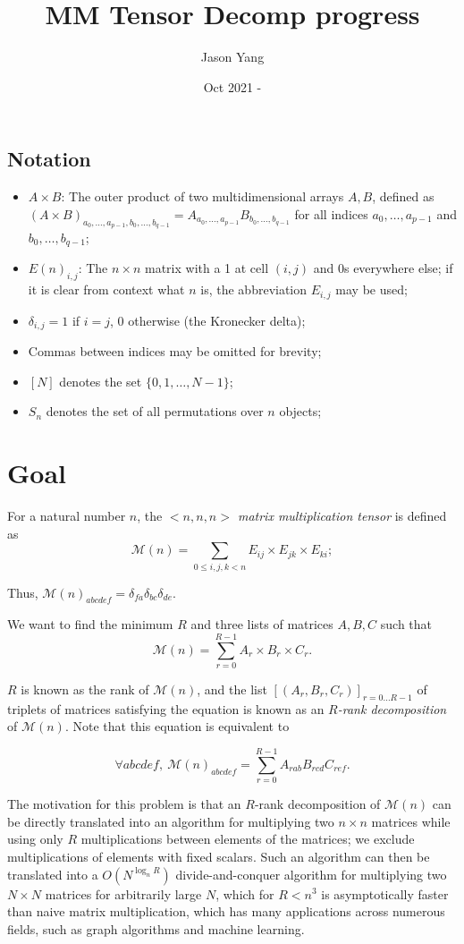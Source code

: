 \documentclass{article}
\title{MM Tensor Decomp progress}
\author{Jason Yang}
\date{Oct 2021 -}
\begin{document}
\maketitle

\subsection*{Notation}
\begin{itemize}
    \item $A\times B$: The outer product of two multidimensional arrays $A,B$, defined as $(A\times B)_{a_0,\dots,a_{p-1},b_0,\dots,b_{q-1}}=A_{a_0,\dots,a_{p-1}}B_{b_0,\dots,b_{q-1}}$ for all indices $a_0,\dots,a_{p-1}$ and $b_0,\dots,b_{q-1}$;
    \item $E(n)_{i,j}$: The $n\times n$ matrix with a 1 at cell $(i,j)$ and 0s everywhere else; if it is clear from context what $n$ is, the abbreviation $E_{i,j}$ may be used;
    \item $\delta_{i,j}=1$ if $i=j$, 0 otherwise (the Kronecker delta);
    \item Commas between indices may be omitted for brevity;
    \item $[N]$ denotes the set $\{0,1,\dots,N-1\}$;
    \item $S_n$ denotes the set of all permutations over $n$ objects;
\end{itemize}

\section{Goal}

For a natural number $n$, the \textit{$<n,n,n>$ matrix multiplication tensor} is defined as
\[\mathcal{M}(n)=\sum_{0\le i,j,k<n} E_{ij}\times E_{jk}\times E_{ki};\]

Thus, $\mathcal{M}(n)_{abcdef}=\delta_{fa}\delta_{bc}\delta_{de}$.

We want to find the minimum $R$ and three lists of matrices $A,B,C$ such that
\[\mathcal{M}(n)=\sum_{r=0}^{R-1}A_r\times B_r\times C_r.\]

$R$ is known as the rank of $\mathcal{M}(n)$, and the list $[(A_r,B_r,C_r)]_{r=0\dots R-1}$ of triplets of matrices satisfying the equation is known as an \textit{$R$-rank decomposition} of $\mathcal{M}(n)$. Note that this equation is equivalent to

\[\forall abcdef,\ \mathcal{M}(n)_{abcdef}=\sum_{r=0}^{R-1}A_{rab}B_{rcd}C_{ref}.\]

The motivation for this problem is that an $R$-rank decomposition of $\mathcal{M}(n)$ can be directly translated into an algorithm for multiplying two $n\times n$ matrices while using only $R$ multiplications between elements of the matrices; we exclude multiplications of elements with fixed scalars. Such an algorithm can then be translated into a $O(N^{\log_n R})$ divide-and-conquer algorithm for multiplying two $N\times N$ matrices for arbitrarily large $N$, which for $R<n^3$ is asymptotically faster than naive matrix multiplication, which has many applications across numerous fields, such as graph algorithms and machine learning.
\end{document}

